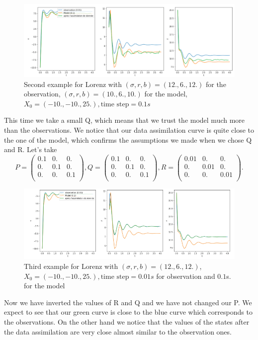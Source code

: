  \begin{figure}[H]
    \centering
		\includegraphics[width=1\textwidth]{"images/enkf/lorenz2_a.png"}
		\caption{Second example for Lorenz with $(\sigma, r, b)=(12.,6.,12.)$ for the observation, $(\sigma, r, b)=(10.,6.,10.)$ for the model, $X_0=(-10.,-10.,25.),\text{time step}=0.1s$ }
\end{figure}
\noindent This time we take a small Q, which means that we trust the model much more than the observations. We notice that our data assimilation curve is quite close to the one of the model, which confirms the assumptions we made when we chose Q and R.
\noindent\newline Let's take 
			$$P=\begin{pmatrix}
            0.1 & 0. & 0. \\
            0. & 0.1 & 0. \\
            0. & 0. & 0.1 \\
            \end{pmatrix} ,
            Q=\begin{pmatrix}
            0.1 & 0. & 0. \\
            0. & 0.1 & 0. \\
            0. & 0. & 0.1 \\
            \end{pmatrix},
            R=\begin{pmatrix}
            0.01 & 0. & 0. \\
            0. & 0.01 & 0. \\
            0. & 0. & 0.01 \\
            \end{pmatrix}.$$ 
 \begin{figure}[H]
        \centering
		\includegraphics[width=1\textwidth]{"images/enkf/lorenz3_b.png"}
		\caption{Third example for Lorenz with $(\sigma, r, b)=(12.,6.,12.)$, $X_0=(-10.,-10.,25.),\text{time step}=0.01s$ for observation and $0.1$s. for the model}
\end{figure}
\noindent Now we have inverted the values of R and Q and we have not changed our P. We expect to see that our green curve is close to the blue curve which corresponds to the observations. On the other hand we notice that the values of the states after the data assimilation are very close almost similar to the observation ones.
